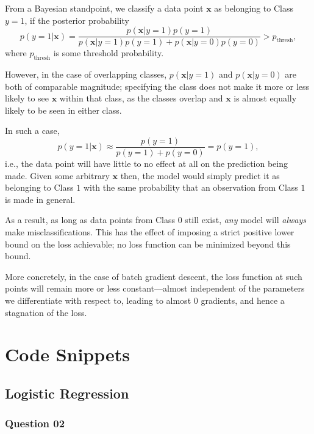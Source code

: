 \documentclass{article}[a4paper]
\begin{document}
	From a Bayesian standpoint, we classify a data point $\mathbf{x}$ as belonging to Class $y=1$, if the posterior probability \[
		p \left( y = 1 \vert \mathbf{x} \right)
		=
		\dfrac{
			p \left( \mathbf{x} \vert y = 1 \right) p \left( y = 1 \right)
		}{
			p \left( \mathbf{x} \vert y = 1 \right) p \left( y = 1 \right)
			+
			p \left( \mathbf{x} \vert y = 0 \right) p \left( y = 0 \right)
		}
		> p_\text{thresh},
	\]
	where $p_\text{thresh}$ is some threshold probability.

	However, in the case of overlapping classes, $p \left( \mathbf{x} \vert y = 1 \right)$ and $p \left( \mathbf{x} \vert y = 0 \right)$ are both of comparable magnitude; specifying the class does not make it more or less likely to see $\mathbf{x}$ within that class, as the classes overlap and $\mathbf{x}$ is almost equally likely to be seen in either class.

	In such a case, \[
		p \left( y = 1 \vert \mathbf{x} \right)
		\approx
		\dfrac{
			p \left( y = 1 \right)
		}{
			p \left( y = 1 \right) + p \left( y = 0 \right)
		}
		= p \left( y = 1 \right),
	\] i.e., the data point will have little to no effect at all on the prediction being made. Given some arbitrary $\mathbf{x}$ then, the model would simply predict it as belonging to Class $1$ with the same probability that an observation from Class $1$ is made in general.
	
	As a result, as long as data points from Class $0$ still exist, \textit{any} model will \textit{always} make misclassifications. This has the effect of imposing a strict positive lower bound on the loss achievable; no loss function can be minimized beyond this bound. 
	
	More concretely, in the case of batch gradient descent, the loss function at such points will remain more or less constant---almost independent of the parameters we differentiate with respect to, leading to almost $0$ gradients, and hence a stagnation of the loss.

	\appendix
	\section{Code Snippets}
	\label{code}

	\subsection{Logistic Regression}

	\subsubsection{Question 02}
\end{document}
